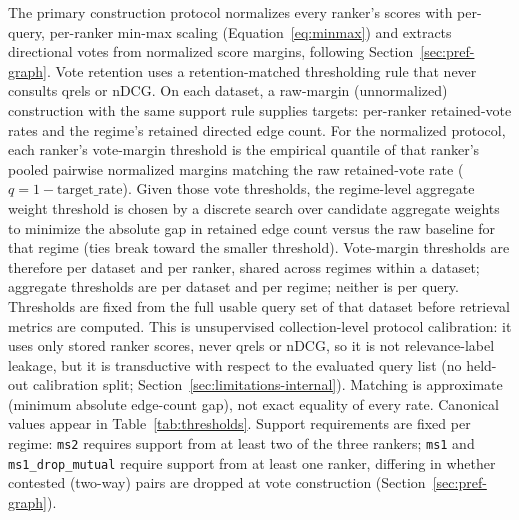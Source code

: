 \documentclass[pdflatex,sn-basic,Numbered]{sn-jnl}
\begin{document}
The primary construction protocol normalizes every ranker's scores with
per-query, per-ranker min-max scaling (Equation~\eqref{eq:minmax}) and
extracts directional votes from normalized score margins, following
Section~\ref{sec:pref-graph}. Vote retention uses a retention-matched
thresholding rule that never consults qrels or nDCG. On each dataset, a
raw-margin (unnormalized) construction with the same support rule supplies
targets: per-ranker retained-vote rates and the regime's retained directed
edge count. For the normalized protocol, each ranker's vote-margin
threshold is the empirical quantile of that ranker's pooled pairwise
normalized margins matching the raw retained-vote rate
($q=1-\mathrm{target\_rate}$). Given those vote thresholds, the
regime-level aggregate weight threshold is chosen by a discrete search over
candidate aggregate weights to minimize the absolute gap in retained edge
count versus the raw baseline for that regime (ties break toward the smaller
threshold). Vote-margin thresholds are therefore per dataset and per
ranker, shared across regimes within a dataset; aggregate thresholds are
per dataset and per regime; neither is per query. Thresholds are fixed from
the full usable query set of that dataset before retrieval metrics are
computed. This is unsupervised collection-level protocol calibration: it
uses only stored ranker scores, never qrels or nDCG, so it is not
relevance-label leakage, but it is transductive with respect to the
evaluated query list (no held-out calibration split;
Section~\ref{sec:limitations-internal}). Matching is approximate
(minimum absolute edge-count gap), not exact equality of every rate.
Canonical values appear in Table~\ref{tab:thresholds}. Support requirements
are fixed per regime:
\texttt{ms2} requires support from at least two of the three rankers;
\texttt{ms1} and \texttt{ms1\_drop\_mutual} require support from at least
one ranker, differing in whether contested (two-way) pairs are dropped at
vote construction (Section~\ref{sec:pref-graph}).
\end{document}
